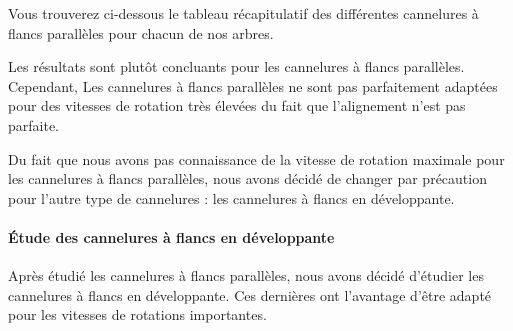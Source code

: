 \documentclass{config}
\begin{document}
\begin{spacing}{1.2}
    
Vous trouverez ci-dessous le tableau récapitulatif des différentes cannelures à flancs parallèles pour chacun de nos arbres.

\begin{table}[h]
\centering
{}
\end{table}

Les résultats sont plutôt concluants pour les cannelures à flancs parallèles. Cependant, Les cannelures à flancs parallèles ne sont pas parfaitement adaptées pour des vitesses de rotation très élevées du fait que l'alignement n'est pas parfaite. 

Du fait que nous avons pas connaissance de la vitesse de rotation maximale pour les cannelures à flancs parallèles, nous avons décidé de changer par précaution pour l'autre type de cannelures : les cannelures à flancs en développante.

\paragraph{Étude des cannelures à flancs en développante \\}

Après étudié les cannelures à flancs parallèles, nous avons décidé d'étudier les cannelures à flancs en développante. Ces dernières ont l'avantage d'être adapté pour les vitesses de rotations importantes.


\end{spacing}
\end{document}

